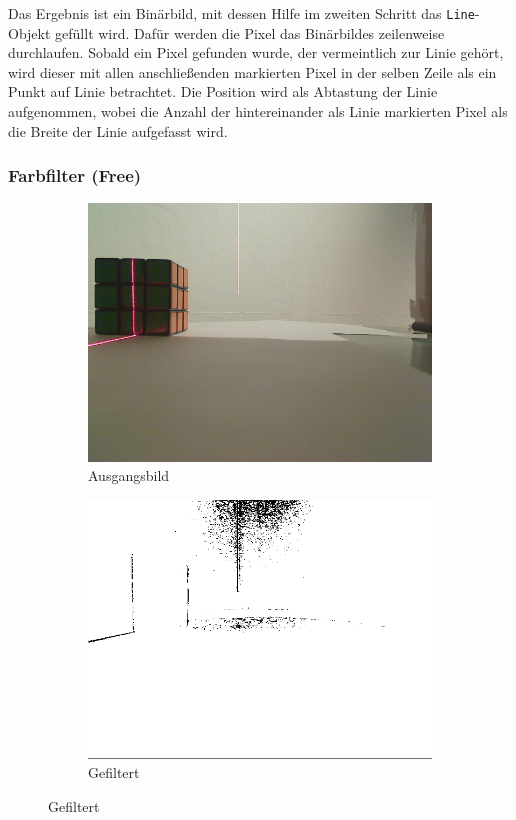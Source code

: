 \documentclass[ngerman,a4paper,parskip=half]{scrartcl}
\begin{document}
Das Ergebnis ist ein Binärbild, mit dessen Hilfe im zweiten Schritt das \texttt{Line}-Objekt gefüllt wird. Dafür werden die Pixel das Binärbildes zeilenweise durchlaufen. Sobald ein Pixel gefunden wurde, der vermeintlich zur Linie gehört, wird dieser mit allen anschließenden markierten Pixel in der selben Zeile als ein Punkt auf Linie betrachtet. Die Position wird als Abtastung der Linie aufgenommen, wobei die Anzahl der hintereinander als Linie markierten Pixel als die Breite der Linie aufgefasst wird.

\subsubsection{Farbfilter (Free)}

\begin{figure}[H]
	\centering

	\begin{subfigure}{0.45\textwidth}
		\includegraphics[width=\textwidth]{includes/line_line.png}
		\caption{Ausgangsbild}
	\end{subfigure}
	\hfill
	\begin{subfigure}{0.45\textwidth}
		\includegraphics[width=\textwidth,frame]{includes/line_free.png}
		\caption{Gefiltert}
	\end{subfigure}


\end{figure}
\end{document}
